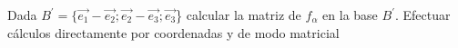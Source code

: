 \documentclass[11pt]{article}
\begin{document}
\begin{question}
\begin{subquestion}{Dada $B^{'}=\{\Vec{e_{1}}-\Vec{e_{2}};\Vec{e_{2}}-\Vec{e_{3}};\Vec{e_{3}}$\} calcular la matriz de $f_{\alpha}$ en la base $B^{'}$. Efectuar cálculos directamente por coordenadas y de modo matricial}
{            %
}
\end{subquestion}
\end{question}
\end{document}
